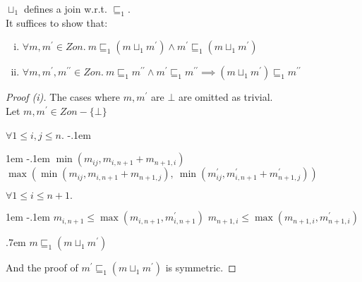 \begin{prop}
  $\sqcup_1$ defines a join w.r.t. $\sqsubseteq_1$.\\
  It suffices to show that:
  \begin{enumerate}[(i)]
    \item $\forall m,m^\prime\in\mathit{Zon}.~m\sqsubseteq_1(m\sqcup_1m^\prime)\wedge m^\prime\sqsubseteq_1(m\sqcup_1m^\prime)$
    \item $\forall m,m^\prime,m^{\prime\prime}\in\mathit{Zon}.~m\sqsubseteq_1m^{\prime\prime}\wedge m^\prime\sqsubseteq_1m^{\prime\prime}\implies(m\sqcup_1m^\prime)\sqsubseteq_1m^{\prime\prime}$
  \end{enumerate}
  \begin{proof}[Proof (i)]
    The cases where $m,m^\prime$ are $\bot$ are omitted as trivial.\\
    \noindent
    Let $m,m^\prime\in\mathit{Zon}-\{\bot\}$
    \begin{itemize}
      \step $\forall1\leq i,j\leq n.$
      \itemsep-.1em
      \begin{itemize}
        \itemindent1em
        \itemsep-.1em
        \step $\min(m_{ij},m_{i,n+1}+m_{n+1,i})$
        \step[\leq] $\max(\min(m_{ij},m_{i,n+1}+m_{n+1,j}),~\min(m^\prime_{ij},m^\prime_{i,n+1}+m^\prime_{n+1,j}))$
      \end{itemize}
      \step[\wedge] $\forall1\leq i\leq n+1.$
      \begin{itemize}
        \itemindent1em
        \itemsep-.1em
        \step $m_{i,n+1}\leq\max(m_{i,n+1},m^\prime_{i,n+1})$
        \step[\wedge] $m_{n+1,i}\leq\max(m_{n+1,i},m^\prime_{n+1,i})$
      \end{itemize}
      \itemsep.7em
      \step[\imps] $m\sqsubseteq_1(m\sqcup_1m^\prime)$
    \end{itemize}
    And the proof of $m^\prime\sqsubseteq_1(m\sqcup_1m^\prime)$ is symmetric.\qedhere
  \end{proof}


\end{prop}
